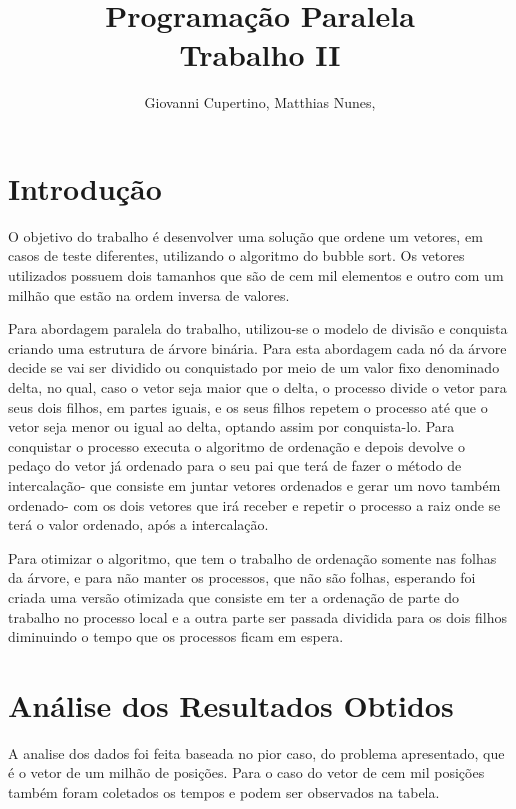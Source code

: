 \documentclass[9pt]{IEEEtran}
\title{Programação Paralela\\ Trabalho II}
\author{Giovanni Cupertino, Matthias Nunes, \IEEEmembership{Usuário pp12820}}
\begin{document}
\maketitle

\section{Introdução}

	O objetivo do trabalho é desenvolver uma solução que ordene um vetores, em
	casos de teste diferentes, utilizando o algoritmo do bubble sort. Os vetores
	utilizados possuem dois tamanhos que são de cem mil elementos e outro com um
	milhão que estão na ordem inversa de valores.

	Para abordagem paralela do trabalho, utilizou-se o modelo de divisão e
	conquista criando uma estrutura de árvore binária. Para esta abordagem cada
	nó da árvore decide se vai ser dividido ou conquistado por meio de um valor
	fixo denominado delta, no qual, caso o vetor seja maior que o delta, o
	processo divide o vetor para seus dois filhos, em partes iguais, e os seus
	filhos repetem o processo até que o vetor seja menor ou igual ao delta,
	optando assim por conquista-lo. Para conquistar o processo executa o
	algoritmo de ordenação e depois devolve o pedaço do vetor já ordenado para o
	seu pai que terá de fazer o método de intercalação- que consiste em juntar
	vetores ordenados e gerar um novo também ordenado- com os dois vetores que
	irá receber e repetir o processo a raiz onde se terá o valor ordenado, após
	a intercalação.

	Para otimizar o algoritmo, que tem o trabalho de ordenação somente nas
	folhas da árvore, e para não manter os processos, que não são folhas,
	esperando foi criada uma versão otimizada que consiste em ter a ordenação de
	parte do trabalho no processo local e a outra parte ser passada dividida
	para os dois filhos diminuindo o tempo que os processos ficam em espera.

\section{Análise dos Resultados Obtidos}

	A analise dos dados foi feita baseada no pior caso, do problema apresentado,
	que é o vetor de um milhão de posições. Para o caso do vetor de cem mil
	posições também foram coletados os tempos e podem ser observados na tabela.
\end{document}
